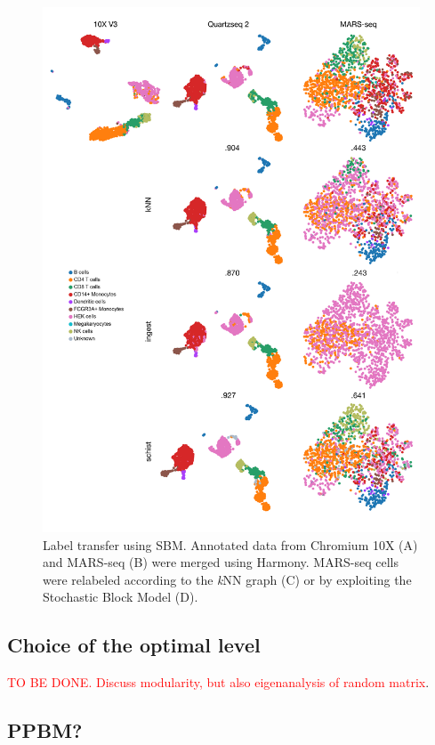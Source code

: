 \documentclass[10pt]{article}
\begin{document}
\begin{figure}[H]
\centering
\includegraphics[keepaspectratio,width=\textwidth,width=0.50\textheight]{Figure_Label_Transfer.png}
\caption[]{Label transfer using SBM. Annotated data from Chromium 10X (A) and  MARS-seq (B) were merged using Harmony. MARS-seq cells were relabeled according to the \emph{k}NN graph (C) or by exploiting the Stochastic Block Model (D). }\label{Figure_Label_Transfer}
\end{figure}


\subsection*{Choice of the optimal level}

\textcolor{red}{TO BE DONE. Discuss modularity, but also eigenanalysis of random matrix}.

\subsection*{PPBM?}
\end{document}
